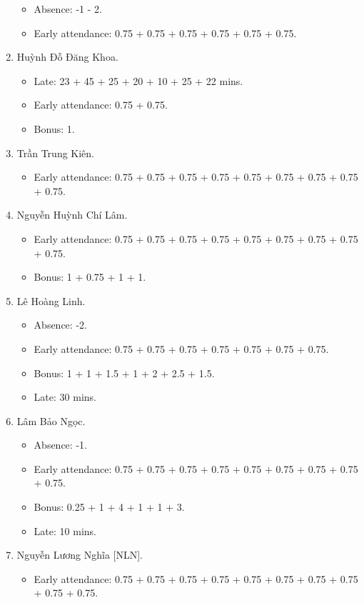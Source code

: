 \documentclass{article}
\begin{document}
\begin{enumerate}
	\begin{itemize}
		\item Absence: -1 - 2.
		\item Early attendance: 0.75 + 0.75 + 0.75 + 0.75 + 0.75 + 0.75.
	\end{itemize}
	\item {\sc Huỳnh Đỗ Đăng Khoa.}
	\begin{itemize}
		\item Late: 23 + 45 + 25 + 20 + 10 + 25 + 22 mins.
		\item Early attendance: 0.75 + 0.75.
        \item Bonus: 1.
	\end{itemize}
	\item {\sc Trần Trung Kiên.}
	\begin{itemize}
		\item Early attendance: 0.75 + 0.75 + 0.75 + 0.75 + 0.75 + 0.75 + 0.75 + 0.75 + 0.75.
	\end{itemize}
	\item {\sc Nguyễn Huỳnh Chí Lâm.}
	\begin{itemize}
		\item Early attendance: 0.75 + 0.75 + 0.75 + 0.75 + 0.75 + 0.75 + 0.75 + 0.75 + 0.75.
		\item Bonus: 1 + 0.75 + 1 + 1.
	\end{itemize}
	\item {\sc Lê Hoàng Linh.}
	\begin{itemize}
        \item Absence: -2.
		\item Early attendance: 0.75 + 0.75 + 0.75 + 0.75 + 0.75 + 0.75 + 0.75.
		\item Bonus: 1 + 1 + 1.5 + 1 + 2 + 2.5 + 1.5.
		\item Late: 30 mins.
	\end{itemize}
	\item {\sc Lâm Bảo Ngọc.}
	\begin{itemize}
		\item Absence: -1.
		\item Early attendance: 0.75 + 0.75 + 0.75 + 0.75 + 0.75 + 0.75 + 0.75 + 0.75 + 0.75.
		\item Bonus: 0.25 + 1 + 4 + 1 + 1 + 3.
		\item Late: 10 mins.
	\end{itemize}
	\item {\sc Nguyễn Lương Nghĩa [NLN].}
	\begin{itemize}
		\item Early attendance: 0.75 + 0.75 + 0.75 + 0.75 + 0.75 + 0.75 + 0.75 + 0.75 + 0.75 + 0.75.

\end{itemize}
\end{enumerate}
\end{document}
